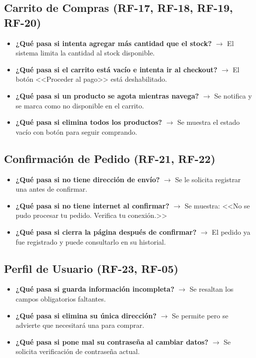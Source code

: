 \documentclass[12pt,a4paper]{article}
\begin{document}
\subsection{Carrito de Compras (RF-17, RF-18, RF-19, RF-20)}
\begin{itemize}
    \item \textbf{¿Qué pasa si intenta agregar más cantidad que el stock?} $\rightarrow$ El sistema limita la cantidad al stock disponible.
    \item \textbf{¿Qué pasa si el carrito está vacío e intenta ir al checkout?} $\rightarrow$ El botón <<Proceder al pago>> está deshabilitado.
    \item \textbf{¿Qué pasa si un producto se agota mientras navega?} $\rightarrow$ Se notifica y se marca como no disponible en el carrito.
    \item \textbf{¿Qué pasa si elimina todos los productos?} $\rightarrow$ Se muestra el estado vacío con botón para seguir comprando.
\end{itemize}

\subsection{Confirmación de Pedido (RF-21, RF-22)}
\begin{itemize}
    \item \textbf{¿Qué pasa si no tiene dirección de envío?} $\rightarrow$ Se le solicita registrar una antes de confirmar.
    \item \textbf{¿Qué pasa si no tiene internet al confirmar?} $\rightarrow$ Se muestra: <<No se pudo procesar tu pedido. Verifica tu conexión.>>
    \item \textbf{¿Qué pasa si cierra la página después de confirmar?} $\rightarrow$ El pedido ya fue registrado y puede consultarlo en su historial.
\end{itemize}

\subsection{Perfil de Usuario (RF-23, RF-05)}
\begin{itemize}
    \item \textbf{¿Qué pasa si guarda información incompleta?} $\rightarrow$ Se resaltan los campos obligatorios faltantes.
    \item \textbf{¿Qué pasa si elimina su única dirección?} $\rightarrow$ Se permite pero se advierte que necesitará una para comprar.
    \item \textbf{¿Qué pasa si pone mal su contraseña al cambiar datos?} $\rightarrow$ Se solicita verificación de contraseña actual.
\end{itemize}
\end{document}
